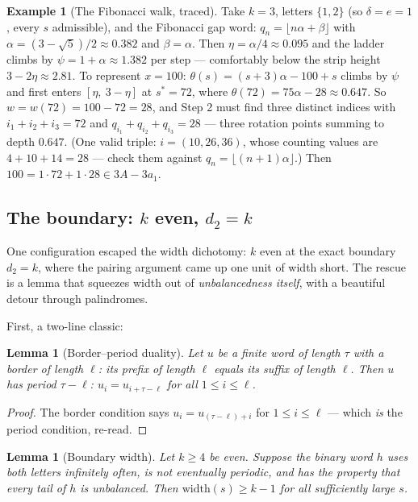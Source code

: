 \documentclass[11pt,reqno]{amsart}
\theoremstyle{plain}
\newtheorem{lemma}[theorem]{Lemma}
\theoremstyle{definition}
\newtheorem{example}[theorem]{Example}
\theoremstyle{remark}
\begin{document}
\begin{example}[The Fibonacci walk, traced]\label{ex:fib-traced}
Take $k = 3$, letters $\{1, 2\}$ (so $\delta = e = 1$, every $s$ admissible), and
the Fibonacci gap word: $q_n = \lfloor n\alpha + \beta \rfloor$ with $\alpha =
(3 - \sqrt5)/2 \approx 0.382$ and $\beta = \alpha$. Then $\eta = \alpha/4 \approx
0.095$ and the ladder climbs by $\psi = 1 + \alpha \approx 1.382$ per step ---
comfortably below the strip height $3 - 2\eta \approx 2.81$. To represent
$x = 100$: $\theta(s) = (s + 3)\alpha - 100 + s$ climbs by $\psi$ and first enters
$[\eta,\ 3 - \eta]$ at $s^* = 72$, where $\theta(72) = 75\alpha - 28 \approx
0.647$. So $w = w(72) = 100 - 72 = 28$, and Step 2 must find three distinct indices
with $i_1 + i_2 + i_3 = 72$ and $q_{i_1} + q_{i_2} + q_{i_3} = 28$ --- three
rotation points summing to depth $0.647$. (One valid triple: $i = (10, 26, 36)$,
whose counting values are $4 + 10 + 14 = 28$ --- check them against $q_n = \lfloor
(n+1)\alpha \rfloor$.) Then $100 = 1 \cdot 72 + 1 \cdot 28 \in 3A - 3a_1$.
\end{example}

\subsection{The boundary: \texorpdfstring{$k$}{k} even, \texorpdfstring{$d_2 = k$}{d2 = k}}

One configuration escaped the width dichotomy: $k$ even at the exact boundary $d_2
= k$, where the pairing argument came up one unit of width short. The rescue is a
lemma that squeezes width out of \emph{unbalancedness itself}, with a beautiful
detour through palindromes.

First, a two-line classic:

\begin{lemma}[Border--period duality]\label{lem:border-period}
Let $u$ be a finite word of length $\tau$ with a \emph{border} of length $\ell$:
its prefix of length $\ell$ equals its suffix of length $\ell$. Then $u$ has
\emph{period} $\tau - \ell$: $u_i = u_{i + \tau - \ell}$ for all $1 \le i \le \ell$.
\end{lemma}

\begin{proof}
The border condition says $u_i = u_{(\tau - \ell) + i}$ for $1 \le i \le \ell$ ---
which \emph{is} the period condition, re-read.
\end{proof}

\begin{lemma}[Boundary width]\label{lem:boundary-friendly}
Let $k \ge 4$ be even. Suppose the binary word $h$ uses both letters infinitely
often, is not eventually periodic, and has the property that \emph{every} tail of
$h$ is unbalanced. Then $\mathrm{width}(s) \ge k - 1$ for all sufficiently large
$s$.
\end{lemma}
\end{document}
